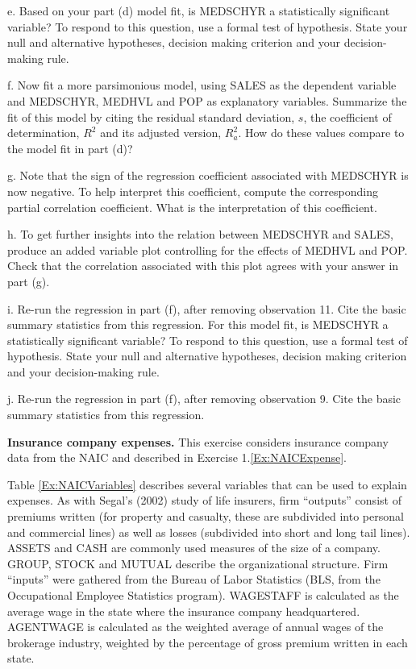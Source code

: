 \begin{exercises}
e. Based on your part (d) model fit, is MEDSCHYR a statistically
significant variable? To respond to this question, use a formal test
of hypothesis. State your null and alternative hypotheses, decision
making criterion and your decision-making rule.

f. Now fit a more parsimonious model, using SALES as the dependent
variable and MEDSCHYR, MEDHVL and POP as explanatory variables.
Summarize the fit of this model by citing the residual standard
deviation, $s$, the coefficient of determination, $R^2$ and its
adjusted version, $R^2_a$. How do these values compare to the model
fit in part (d)?

g. Note that the sign of the regression coefficient associated with
MEDSCHYR is now negative. To help interpret this coefficient,
compute the corresponding partial correlation coefficient. What is
the interpretation of this coefficient.

h. To get further insights into the relation between MEDSCHYR and
SALES, produce an added variable plot controlling for the effects of
MEDHVL and POP. Check that the correlation associated with this plot
agrees with your answer in part (g).

i. Re-run the regression in part (f), after removing observation 11.
Cite the basic summary statistics from this regression. For this
model fit, is MEDSCHYR a statistically significant variable? To
respond to this question, use a formal test of hypothesis. State
your null and alternative hypotheses, decision making criterion and
your decision-making rule.

j. Re-run the regression in part (f), after removing observation 9.
Cite the basic summary statistics from this regression.


\item \textbf{Insurance company expenses.}\label{Ex:NAICExpense3}
This exercise considers insurance company data from the NAIC and
described in Exercise 1.\ref{Ex:NAICExpense}.

Table \ref{Ex:NAICVariables} describes several variables that can be
used to explain expenses. As with Segal's (2002) study of life
insurers, firm ``outputs'' consist of premiums written (for property
and casualty, these are subdivided into personal and commercial
lines) as well as losses (subdivided into short and long tail
lines). ASSETS and CASH are commonly used measures of the size of a
company. GROUP, STOCK and MUTUAL describe the organizational
structure. Firm ``inputs'' were gathered from the Bureau of Labor
Statistics (BLS, from the Occupational Employee Statistics program).
WAGESTAFF is calculated as the average wage in the state where the
insurance company headquartered. AGENTWAGE is calculated as the
weighted average of annual wages of the brokerage industry, weighted
by the percentage of gross premium written in each state.





\end{exercises}
